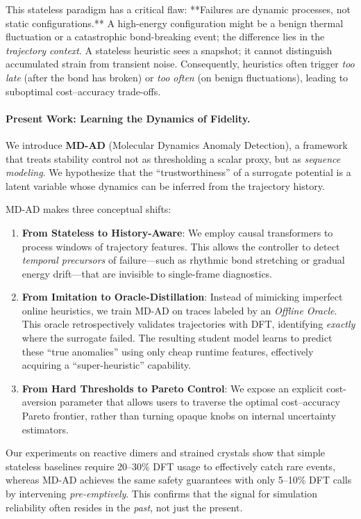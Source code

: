 \documentclass{article}
\begin{document}
This stateless paradigm has a critical flaw: **Failures are dynamic processes, not static configurations.** A high-energy configuration might be a benign thermal fluctuation or a catastrophic bond-breaking event; the difference lies in the \emph{trajectory context}. A stateless heuristic sees a snapshot; it cannot distinguish accumulated strain from transient noise. Consequently, heuristics often trigger \emph{too late} (after the bond has broken) or \emph{too often} (on benign fluctuations), leading to suboptimal cost--accuracy trade-offs.

\paragraph{Present Work: Learning the Dynamics of Fidelity.}
We introduce \textbf{MD-AD} (Molecular Dynamics Anomaly Detection), a framework that treats stability control not as thresholding a scalar proxy, but as \emph{sequence modeling}. We hypothesize that the ``trustworthiness'' of a surrogate potential is a latent variable whose dynamics can be inferred from the trajectory history.

MD-AD makes three conceptual shifts:
\begin{enumerate}
    \item \textbf{From Stateless to History-Aware}: We employ causal transformers to process windows of trajectory features. This allows the controller to detect \emph{temporal precursors} of failure—such as rhythmic bond stretching or gradual energy drift—that are invisible to single-frame diagnostics.
    \item \textbf{From Imitation to Oracle-Distillation}: Instead of mimicking imperfect online heuristics, we train MD-AD on traces labeled by an \emph{Offline Oracle}. This oracle retrospectively validates trajectories with DFT, identifying \emph{exactly} where the surrogate failed. The resulting student model learns to predict these ``true anomalies'' using only cheap runtime features, effectively acquiring a ``super-heuristic'' capability.
    \item \textbf{From Hard Thresholds to Pareto Control}: We expose an explicit cost-aversion parameter that allows users to traverse the optimal cost--accuracy Pareto frontier, rather than turning opaque knobs on internal uncertainty estimators.
\end{enumerate}

Our experiments on reactive dimers and strained crystals show that simple stateless baselines require 20--30\% DFT usage to effectively catch rare events, whereas MD-AD achieves the same safety guarantees with only 5--10\% DFT calls by intervening \emph{pre-emptively}. This confirms that the signal for simulation reliability often resides in the \emph{past}, not just the present.
\end{document}

